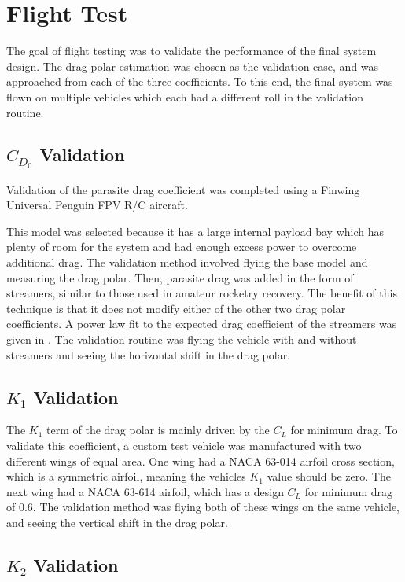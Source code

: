 \chapter{Flight Test}
\label{flight-test}
The goal of flight testing was to validate the performance of the final system design. The drag polar estimation was chosen as the validation case, and was approached from each of the three coefficients. To this end, the final system was flown on multiple vehicles which each had a different roll in the validation routine.

\section{$C_{D_0}$ Validation}
Validation of the parasite drag coefficient was completed using a Finwing Universal Penguin FPV R/C aircraft\cite{penguinRC}. 

This model was selected because it has a large internal payload bay which has plenty of room for the system and had enough excess power to overcome additional drag. The validation method involved flying the base model and measuring the drag polar. Then, parasite drag was added in the form of streamers, similar to those used in amateur rocketry recovery. The benefit of this technique is that it does not modify either of the other two drag polar coefficients. A power law fit to the expected drag coefficient of the streamers was given in \cite{Auman2001}. The validation routine was flying the vehicle with and without streamers and seeing the horizontal shift in the drag polar.

\section{$K_1$ Validation}
The $K_1$ term of the drag polar is mainly driven by the $C_L$ for minimum drag. To validate this coefficient, a custom test vehicle was manufactured with two different wings of equal area. One wing had a NACA 63-014 airfoil cross section, which is a symmetric airfoil, meaning the vehicles $K_1$ value should be zero. The next wing had a NACA 63-614 airfoil, which has a design $C_L$ for minimum drag of 0.6. The validation method was flying both of these wings on the same vehicle, and seeing the vertical shift in the drag polar.
\section{$K_2$ Validation}